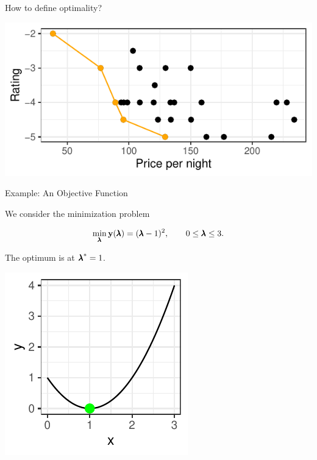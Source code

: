 \begin{frame}[allowframebreaks]{How to define optimality?}
\begin{itemize}
\vspace*{0.3cm}

\centering \includegraphics[width=0.8\linewidth]{images/expedia-5-1}



\end{itemize}

\end{frame}

\begin{frame}{Example: An Objective Function}


We consider the minimization problem

$$
\min_{\pmb{\lambda}} \mathbf{y}(\pmb{\lambda}) = (\pmb{\lambda} - 1)^2, \qquad 0 \le \pmb{\lambda} \le 3.
$$

The optimum is at ${\pmb{\lambda}}^* = 1$.

\vspace*{0.1cm}


\centering \includegraphics[scale=1]{images/expedia-6-1}


\end{frame}

